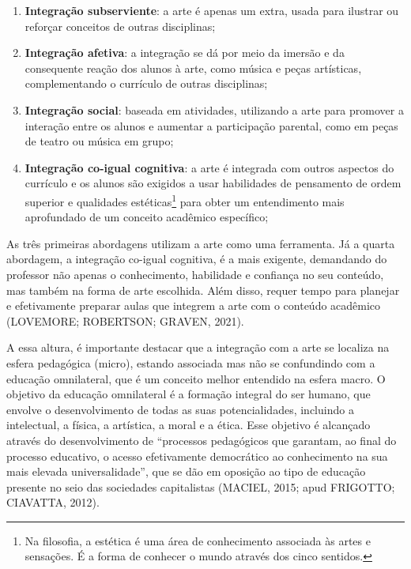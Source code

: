 \documentclass[
  letterpaper,
  DIV=11,
  numbers=noendperiod]{scrreprt}
\providecommand{\tightlist}{%
  \setlength{\itemsep}{0pt}\setlength{\parskip}{0pt}}\usepackage{longtable,booktabs,array}
\begin{document}
\begin{enumerate}
\def\labelenumi{\arabic{enumi}.}
\tightlist
\item
  \textbf{Integração subserviente}: a arte é apenas um extra, usada para
  ilustrar ou reforçar conceitos de outras disciplinas;
\item
  \textbf{Integração afetiva}: a integração se dá por meio da imersão e
  da consequente reação dos alunos à arte, como música e peças
  artísticas, complementando o currículo de outras disciplinas;
\item
  \textbf{Integração social}: baseada em atividades, utilizando a arte
  para promover a interação entre os alunos e aumentar a participação
  parental, como em peças de teatro ou música em grupo;
\item
  \textbf{Integração co-igual cognitiva}: a arte é integrada com outros
  aspectos do currículo e os alunos são exigidos a usar habilidades de
  pensamento de ordem superior e qualidades estéticas\footnote{Na
    filosofia, a estética é uma área de conhecimento associada às artes
    e sensações. É a forma de conhecer o mundo através dos cinco
    sentidos.} para obter um entendimento mais aprofundado de um
  conceito acadêmico específico;
\end{enumerate}

As três primeiras abordagens utilizam a arte como uma ferramenta. Já a
quarta abordagem, a integração co-igual cognitiva, é a mais exigente,
demandando do professor não apenas o conhecimento, habilidade e
confiança no seu conteúdo, mas também na forma de arte escolhida. Além
disso, requer tempo para planejar e efetivamente preparar aulas que
integrem a arte com o conteúdo acadêmico (LOVEMORE; ROBERTSON; GRAVEN,
2021).

A essa altura, é importante destacar que a integração com a arte se
localiza na esfera pedagógica (micro), estando associada mas não se
confundindo com a educação omnilateral, que é um conceito melhor
entendido na esfera macro. O objetivo da educação omnilateral é a
formação integral do ser humano, que envolve o desenvolvimento de todas
as suas potencialidades, incluindo a intelectual, a física, a artística,
a moral e a ética. Esse objetivo é alcançado através do desenvolvimento
de ``processos pedagógicos que garantam, ao final do processo educativo,
o acesso efetivamente democrático ao conhecimento na sua mais elevada
universalidade'', que se dão em oposição ao tipo de educação presente no
seio das sociedades capitalistas (MACIEL, 2015; apud FRIGOTTO; CIAVATTA,
2012).
\end{document}
